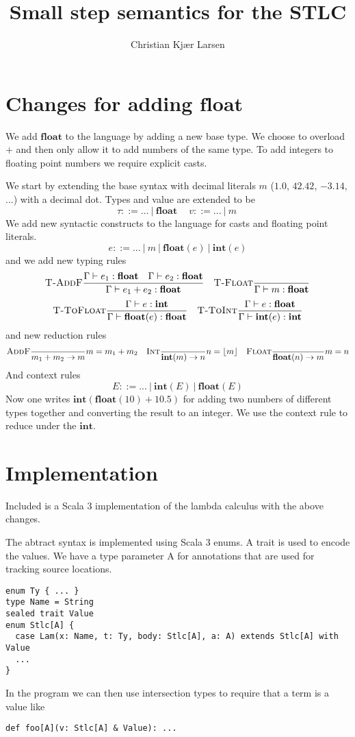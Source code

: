\documentclass[11pt]{article}
\title{Small step semantics for the STLC}
\author{Christian Kjær Larsen}
\begin{document}
\maketitle
\section{Changes for adding $\mathbf{float}$}
We add $\mathbf{float}$ to the language by adding a new base type. We choose to overload $+$ and then only allow it to add numbers of the same type. To add integers to floating point numbers we require explicit casts.

We start by extending the base syntax with decimal literals $m$ ($1.0$, $42.42$, $-3.14$, ...) with a decimal dot. Types and value are extended to be
\[
    \tau ::= ... \ |\ \mathbf{float}\ \quad
    v ::= ... \ |\ m\
\]
We add new syntactic constructs to the language for casts and floating point literals.
\[
    e ::= ... \ |\ m \ |\ \mathbf{float}(e)\ |\ \mathbf{int}(e)
\]
and we add new typing rules
\[
    \textsc{T-AddF}\frac{\Gamma \vdash e_1 : \mathbf{float}\quad \Gamma \vdash e_2 : \mathbf{float}}{\Gamma \vdash e_1 + e_2 : \mathbf{float}} \quad
    \textsc{T-Float}\frac{}{\Gamma \vdash m : \mathbf{float}}
\]
\[
    \textsc{T-ToFloat}\frac{\Gamma \vdash e : \mathbf{int}}{\Gamma \vdash \mathbf{float}(e) : \mathbf{float}} \quad
    \textsc{T-ToInt}\frac{\Gamma \vdash e : \mathbf{float}}{\Gamma \vdash \mathbf{int}(e) : \mathbf{int}}
\]
and new reduction rules
\[
    \textsc{AddF}\frac{}{m_1 + m_2 \rightarrow m}m = m_1 + m_2 \quad
    \textsc{Int}\frac{}{\mathbf{int}(m) \rightarrow n}n = \lfloor m \rfloor \quad
    \textsc{Float}\frac{}{\mathbf{float}(n) \rightarrow m}m = n
\]
And context rules
\[
    E ::= ...\ |\ \mathbf{int}(E) \ |\ \mathbf{float}(E)
\]
Now one writes $\mathbf{int}(\mathbf{float}(10) + 10.5)$ for adding two numbers of different types together and converting the result to an integer. We use the context rule to reduce under the $\mathbf{int}$.
\section{Implementation}
Included is a Scala 3 implementation of the lambda calculus with the above changes.

The abtract syntax is implemented using Scala 3 enums. A trait is used to encode the values. We have a type parameter A for annotations that are used for tracking source locations.
\begin{lstlisting}
enum Ty { ... }
type Name = String
sealed trait Value
enum Stlc[A] {
  case Lam(x: Name, t: Ty, body: Stlc[A], a: A) extends Stlc[A] with Value
  ...
}
\end{lstlisting}
In the program we can then use intersection types to require that a term is a value like
\begin{lstlisting}
def foo[A](v: Stlc[A] & Value): ...
\end{lstlisting}
\end{document}
